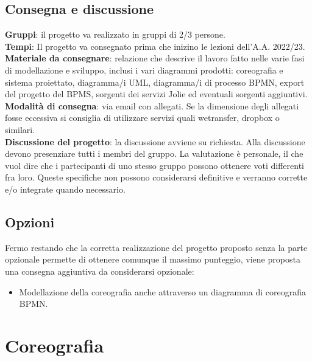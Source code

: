 \documentclass[11pt]{article} %
\begin{document}
\subsection{Consegna e discussione}
\textbf{Gruppi}: il progetto va realizzato in gruppi di 2/3 persone.\\
\textbf{Tempi}: Il progetto va consegnato prima che inizino le lezioni dell’A.A. 2022/23.\\
\textbf{Materiale da consegnare}: relazione che descrive il lavoro fatto nelle varie fasi di modellazione e sviluppo, inclusi i vari diagrammi prodotti: coreografia e sistema proiettato, diagramma/i UML, diagramma/i di processo BPMN, export del progetto del BPMS, sorgenti dei servizi Jolie ed eventuali sorgenti aggiuntivi.\\
\textbf{Modalità  di consegna}: via email con allegati. Se la dimensione degli allegati fosse eccessiva si consiglia di utilizzare servizi quali wetransfer, dropbox o similari.\\
\textbf{Discussione del progetto}: la discussione avviene su richiesta. Alla discussione devono presenziare tutti i membri del gruppo. La valutazione è personale, il che vuol dire che i partecipanti di uno stesso gruppo possono ottenere voti differenti fra loro. Queste specifiche non possono considerarsi definitive e verranno corrette e/o integrate quando necessario.

\subsection{Opzioni}
Fermo restando che la corretta realizzazione del progetto proposto senza la parte opzionale permette di ottenere comunque il massimo punteggio, viene proposta una consegna aggiuntiva da considerarsi opzionale:
\begin{itemize}
\item Modellazione della coreografia anche attraverso un diagramma di coreografia BPMN.
\end{itemize}

\clearpage

\section{Coreografia}
\end{document}
